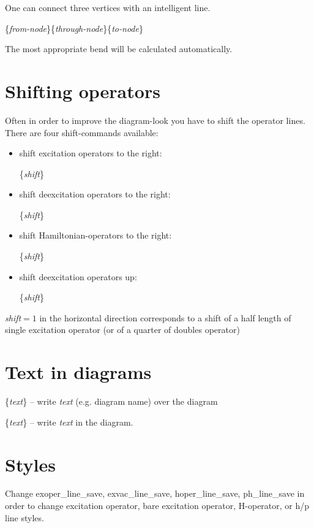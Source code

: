 \documentclass[a4paper]{article}
\newcommand{\myind}{\hspace{10pt}}
\begin{document}
One can connect three vertices with an intelligent line. 

\myind{\bf \textbackslash dcurt}\{{\it from-node}\}\{{\it through-node}\}\{{\it to-node}\}

The most appropriate bend will be calculated automatically.

\section{Shifting operators}

Often in order to improve the diagram-look you have to shift the operator lines.
There are four shift-commands available:
\begin{itemize}
 \item shift excitation operators to the right:

\myind{\bf \textbackslash dmoveT}\{{\it shift}\}

 \item  shift deexcitation operators to the right:

\myind{\bf \textbackslash dmoveTd}\{{\it shift}\}

 \item  shift Hamiltonian-operators to the right:

\myind{\bf \textbackslash dmovex}\{{\it shift}\}

  \item  shift deexcitation operators up:

\myind{\bf \textbackslash dmovac}\{{\it shift}\}
\end{itemize}

{\it shift}$=1$ in the horizontal direction corresponds to a shift of a half length of single excitation operator
(or of a quarter of doubles operator) 

\section{Text in diagrams}

\myind{\bf \textbackslash dname}\{{\it text}\} -- write {\it text} (e.g. diagram name) over the diagram

\myind{\bf \textbackslash dtext}\{{\it text}\} -- write {\it text} in the diagram.

\section{Styles}\label{sec:Styles}

Change exoper\_line\_save, exvac\_line\_save, hoper\_line\_save, ph\_line\_save
in order to change excitation operator, bare excitation operator, H-operator, or h/p line styles.
\end{document}
